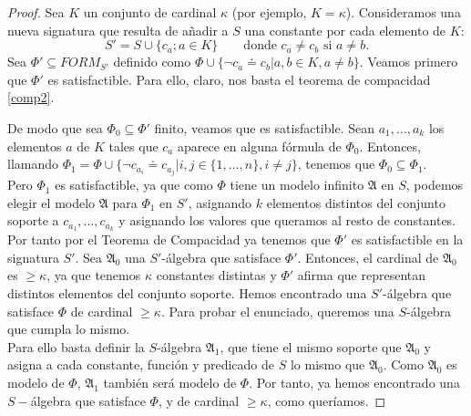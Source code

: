 \begin{proof}
Sea $K$ un conjunto de cardinal $\kappa$ (por ejemplo, $K=\kappa$). Consideramos una nueva signatura que resulta de añadir a $S$ una constante por cada elemento de $K$:
\[S'=S\cup\{c_a;a\in K\}\qquad\text{donde $c_a\neq c_b$ si $a\neq b$.}\]
Sea $\Phi'\subseteq FORM_{S'}$ definido como $\Phi\cup\{\neg c_a\doteq c_b|a,b\in K,a\neq b\}$. Veamos primero que $\Phi'$ es satisfactible. Para ello, claro, nos basta el teorema de compacidad \ref{comp2}.

De modo que sea $\Phi_0\subseteq\Phi'$ finito, veamos que es satisfactible. Sean $a_1,\dots,a_k$ los elementos $a$ de $K$ tales que $c_a$ aparece en alguna fórmula de $\Phi_0$. Entonces, llamando $\Phi_1=\Phi\cup\{\neg c_{a_i}\doteq c_{a_j}|i,j\in\{1,\dots,n\},i\neq j\}$, tenemos que $\Phi_0\subseteq\Phi_1$.\\

Pero $\Phi_1$ es satisfactible, ya que como $\Phi$ tiene un modelo infinito $\mathfrak{A}$ en $S$, podemos elegir el modelo $\mathfrak{A}$ para $\Phi_1$ en $S'$, asignando $k$ elementos distintos del conjunto soporte a $c_{a_1},\dots,c_{a_k}$ y asignando los valores que queramos al resto de constantes.\\

Por tanto por el Teorema de Compacidad ya tenemos que $\Phi'$ es satisfactible en la signatura $S'$. Sea $\mathfrak{A}_0$ una $S'$-álgebra que satisface $\Phi'$. Entonces, el cardinal de $\mathfrak{A}_0$ es $\geq\kappa$, ya que tenemos $\kappa$ constantes distintas y $\Phi'$ afirma que representan distintos elementos del conjunto soporte. Hemos encontrado una $S'$-álgebra que satisface $\Phi$ de cardinal $\geq\kappa$. Para probar el enunciado, queremos una $S$-álgebra que cumpla lo mismo.\\

Para ello basta definir la $S$-álgebra $\mathfrak{A}_1$, que tiene el mismo soporte que $\mathfrak{A}_0$ y asigna a cada constante, función y predicado de $S$ lo mismo que $\mathfrak{A}_0$. Como $\mathfrak{A}_0$ es modelo de $\Phi$, $\mathfrak{A}_1$ también será modelo de $\Phi$. Por tanto, ya hemos encontrado una $S-$álgebra que satisface $\Phi$, y de cardinal $\geq\kappa$, como queríamos.
\end{proof}

